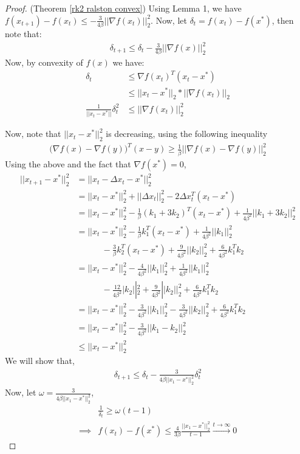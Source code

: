 \begin{proof}(Theorem \ref{rk2 ralston convex})
Using Lemma 1, we have $f(x_{t+1}) - f(x_{t}) \leq -\frac{3}{4\beta}|| \nabla f(x_{t}) ||_2^2 $. Now, let $\delta_t = f(x_t) - f(x^*)$, then note that:
\begin{align*}
\delta_{t+1} \leq \delta_t - \frac{3}{4\beta}|| \nabla f(x) ||_2^2
\end{align*}
Now, by convexity of $f(x)$ we have:
\begin{align}
\delta_t &\leq \nabla f(x_t)^T (x_t - x^*) \\
 &\leq || x_t - x^* ||_2 * || \nabla f(x_t) ||_2 \\
\frac{1}{|| x_t - x^* || }\delta_t^2 & \leq  || \nabla f(x_t) ||_2^2
\end{align}

Now, note that $|| x_t - x^*||_2^2$ is decreasing, using the following inequality
\begin{align*}
\big( \nabla f(x) - \nabla f(y)  \big)^T(x-y)  \geq \frac{1}{\beta} || \nabla f(x) - \nabla f(y) ||_2^2
\end{align*}
Using the above and the fact that $\nabla f(x^*) = 0$,
\begin{align*}
|| x_{t+1} - x^* ||_2^2 &= || x_t - \Delta x_t - x^* ||_2^2 \\
&= || x_t - x^* ||_2^2 + || \Delta x_t ||_2^2 - 2 \Delta x_t^T(x_t - x^*) \\
&= || x_t - x^* ||_2^2 - \frac{1}{\beta}(k_1 + 3k_2)^T (x_t - x^*) + \frac{1}{4 \beta^2}|| k_1 + 3k_2 ||_2^2 \\
&= || x_t - x^* ||_2^2 - \frac{1}{ \beta}k_1^T (x_t - x^*) + \frac{1}{4 \beta^2}|| k_1 ||_2^2  \\
& \quad \quad \quad - \frac{3}{\beta}k_2^T (x_t - x^*) + \frac{9}{4 \beta^2}|| k_2 ||_2^2 + \frac{6}{4 \beta^2} k_1 ^T k_2 \\
&= || x_t - x^* ||_2^2 - \frac{4}{4 \beta^2}||k_1 ||_2^2 + \frac{1}{4 \beta^2}|| k_1 ||_2^2  \\
& \quad \quad \quad - \frac{12}{4 \beta^2}|k_2||_2^2 + \frac{9}{4 \beta^2}|| k_2 ||_2^2 + \frac{6}{4 \beta^2} k_1 ^T k_2 \\
&= || x_t - x^* ||_2^2 - \frac{3}{4 \beta^2}||k_1||_2^2 - \frac{3}{4 \beta^2}||k_2||_2^2 + \frac{6}{4 \beta^2} k_1 ^T k_2 \\
&= || x_t - x^* ||_2^2 -  \frac{3}{4 \beta^2}|| k_1 - k_2||_2^2  \\
& \leq || x_t - x^* ||_2^2
\end{align*}
We will show that,
\begin{align}
\delta_{t+1} \leq \delta_t - \frac{3}{4 \beta || x_1 - x^* ||_2^2} \delta_t^2
\end{align}
Now, let $\omega = \frac{3}{4 \beta   || x_1 - x^* ||_2^2}$, %
\begin{align*}
& \frac{1}{\delta_t} \geq \omega (t-1) \\
\implies & f(x_t) - f(x^*) \leq \frac{4}{3 \beta} \frac{ || x_1 - x^* ||_2^2}{t-1} \xrightarrow{t \to \infty} 0
\end{align*}
\end{proof}




